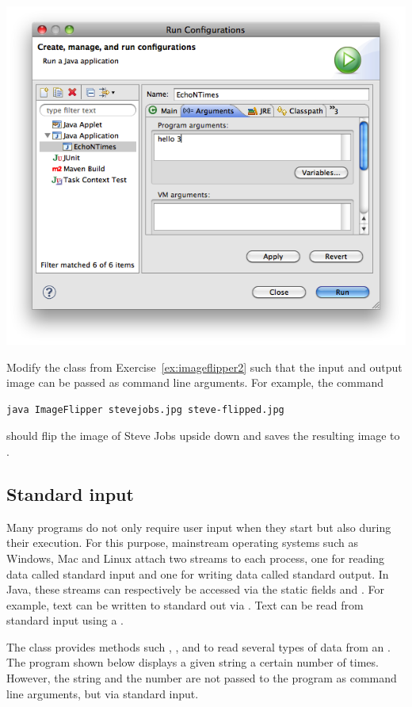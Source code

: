 \documentclass{book}
\begin{document}
\includegraphics[scale=0.5]{arguments-eclipse.png} 

\begin{exercise}\label{ex:imageflipper3}
Modify the class  from Exercise~\ref{ex:imageflipper2} such that the input and output image can be passed as command line arguments. For example, the command
\begin{verbatim}
java ImageFlipper stevejobs.jpg steve-flipped.jpg 
\end{verbatim}
should flip the image of Steve Jobs upside down and saves the resulting image to .
\end{exercise}

\subsection{Standard input}
Many programs do not only require user input when they start but also during their execution. For this purpose, mainstream operating systems such as Windows, Mac and Linux attach two streams to each process, one for reading data called standard input and one for writing data called standard output. In Java, these streams can respectively be accessed via the static fields  and . For example, text can be written to standard out via . Text can be read from standard input using a .

The class  provides methods such , ,  and  to read several types of data from an . The program shown below displays a given string a certain number of times. However, the string and the number are not passed to the program as command line arguments, but via standard input.
\end{document}

